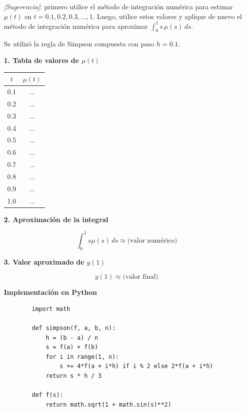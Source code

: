 \begin{enumerate}
    \smallskip
    \noindent\textit{[Sugerencia]}: primero utilice el método de integración numérica para
    estimar $\mu(t)$ en $t=0.1, 0.2, 0.3,\ldots,1$. Luego, utilice estos valores y
    aplique de nuevo el método de integración numérica para aproximar
    $\displaystyle\int_0^1 s\,\mu(s)\,ds$.

         \begin{respuesta}[title=Punto 2 — Aproximación Numérica]

        Se utilizó la regla de Simpson compuesta con paso \(h=0.1\).

        \textbf{1. Tabla de valores de $\mu(t)$}

        \begin{center}
        \begin{tabular}{cc}
        \toprule
        $t$ & $\mu(t)$ \\
        \midrule
        0.1 & ... \\
        0.2 & ... \\
        0.3 & ... \\
        0.4 & ... \\
        0.5 & ... \\
        0.6 & ... \\
        0.7 & ... \\
        0.8 & ... \\
        0.9 & ... \\
        1.0 & ... \\
        \bottomrule
        \end{tabular}
        \end{center}

        \textbf{2. Aproximación de la integral}

        \[
        \int_0^1 s\mu(s)\,ds \approx \text{(valor numérico)}
        \]

        \textbf{3. Valor aproximado de $y(1)$}

        \[
        y(1) \approx \text{(valor final)}
        \]

        \textbf{Implementación en Python}

        \begin{verbatim}
        import math

        def simpson(f, a, b, n):
            h = (b - a) / n
            s = f(a) + f(b)
            for i in range(1, n):
                s += 4*f(a + i*h) if i % 2 else 2*f(a + i*h)
            return s * h / 3

        def f(s):
            return math.sqrt(1 + math.sin(s)**2)


\end{verbatim}
\end{respuesta}
\end{enumerate}
